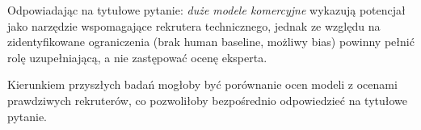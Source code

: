 \documentclass[12pt, a4paper]{article}
\begin{document}
Odpowiadając na tytułowe pytanie: \textit{duże modele komercyjne} wykazują potencjał
jako narzędzie wspomagające rekrutera technicznego, jednak ze względu na zidentyfikowane
ograniczenia (brak human baseline, możliwy bias) powinny pełnić rolę uzupełniającą,
a nie zastępować ocenę eksperta.

Kierunkiem przyszłych badań mogłoby być porównanie ocen modeli z ocenami prawdziwych
rekruterów, co pozwoliłoby bezpośrednio odpowiedzieć na tytułowe pytanie.

\printbibliography[title={Bibliografia}]
\end{document}
